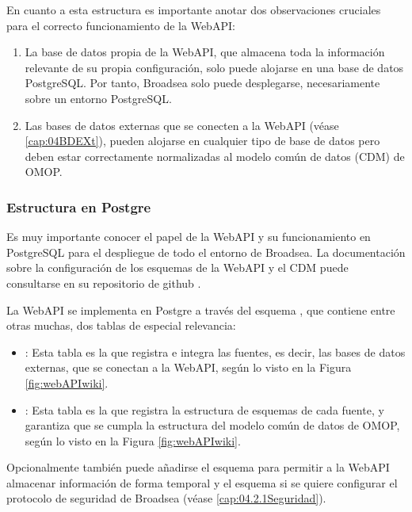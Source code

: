 En cuanto a esta estructura es importante anotar dos observaciones cruciales para el correcto funcionamiento de la WebAPI:

\begin{enumerate}
     \item La base de datos propia de la WebAPI, que almacena toda la información relevante de su propia configuración, solo puede alojarse en una base de datos PostgreSQL. Por tanto, Broadsea solo puede desplegarse, necesariamente sobre un entorno PostgreSQL.
    \item Las bases de datos externas que se conecten a la WebAPI (véase \ref{cap:04BDEXt}), pueden alojarse en cualquier tipo de base de datos pero deben estar correctamente normalizadas al modelo común de datos (CDM) de OMOP. 

\end{enumerate}

\subsubsection{Estructura en Postgre}

Es muy importante conocer el papel de la WebAPI y su funcionamiento en PostgreSQL para el despliegue de todo el entorno de Broadsea. La documentación sobre la configuración de los esquemas de la WebAPI y el CDM puede consultarse en su repositorio de github \cite{githubCDMConfig}.

La WebAPI se implementa en Postgre a través del esquema , que contiene entre otras muchas, dos tablas de especial relevancia: 

\begin{itemize}
    \item {}: Esta tabla es la que registra e integra las fuentes, es decir, las bases de datos externas, que se conectan a la WebAPI, según lo visto en la Figura \ref{fig:webAPIwiki}.
    \item {}: Esta tabla es la que registra la estructura de esquemas de cada fuente, y garantiza que se cumpla la estructura del modelo común de datos de OMOP, según lo visto en la Figura \ref{fig:webAPIwiki}.
\end{itemize}

Opcionalmente también puede añadirse el esquema  para permitir a la WebAPI almacenar información de forma temporal y el esquema  si se quiere configurar el protocolo de seguridad de Broadsea (véase \ref{cap:04.2.1Seguridad}).

